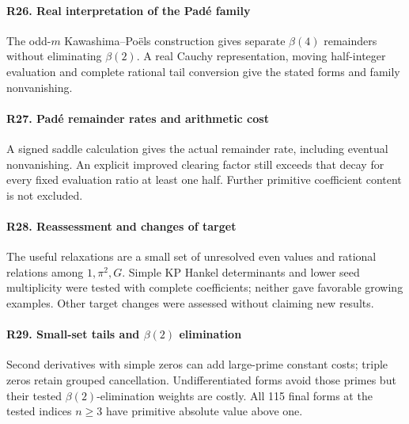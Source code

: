 \paragraph{R26. Real interpretation of the Padé family}\label{record-R26}
The odd-$m$ Kawashima--Poëls construction gives separate $\beta(4)$ remainders without eliminating $\beta(2)$. A real Cauchy representation, moving half-integer evaluation and complete rational tail conversion give the stated forms and family nonvanishing.

\paragraph{R27. Padé remainder rates and arithmetic cost}\label{record-R27}
A signed saddle calculation gives the actual remainder rate, including eventual nonvanishing. An explicit improved clearing factor still exceeds that decay for every fixed evaluation ratio at least one half. Further primitive coefficient content is not excluded.

\paragraph{R28. Reassessment and changes of target}\label{record-R28}
The useful relaxations are a small set of unresolved even values and rational relations among $1,\pi^2,G$. Simple KP Hankel determinants and lower seed multiplicity were tested with complete coefficients; neither gave favorable growing examples. Other target changes were assessed without claiming new results.

\paragraph{R29. Small-set tails and $\beta(2)$ elimination}\label{record-R29}
Second derivatives with simple zeros can add large-prime constant costs; triple zeros retain grouped cancellation. Undifferentiated forms avoid those primes but their tested $\beta(2)$-elimination weights are costly. All 115 final forms at the tested indices $n\ge3$ have primitive absolute value above one.
